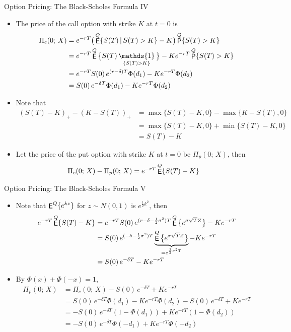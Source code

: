 \documentclass[10pt,handout]{beamer}
\DeclareMathOperator\indc{\mathds{1}}
\DeclareMathOperator\prb{{\sf P}}
\DeclareMathOperator\expc{{\sf E}}
\theoremstyle{definition}
\begin{document}
\begin{frame}{Option Pricing: The Black-Scholes Formula IV}
  \begin{itemize}
    \item The price of the call option with strike $K$ at $t = 0$ is
      \begin{align*}
        \Pi_c(0;\,X) &= e^{-rT}\big(\expc^Q\{S(T)\,|\, S(T) > K\} - K\big)\prb^Q\{S(T) > K\} \\
        &= e^{-rT}\expc^Q\big\{S(T)\indc_{\{S(T) > K\}}\big\} - Ke^{-rT}\prb^Q\{S(T) > K\} \\
        &= e^{-rT}S(0)\,e^{(r - \delta)T}\Phi(d_1) - Ke^{-rT}\Phi(d_2) \\
        &= S(0)\,e^{-\delta T}\Phi(d_1) - Ke^{-rT}\Phi(d_2)
      \end{align*}
    \item Note that 
      \begin{align*}
        (S(T) - K)_+ - (K - S(T))_+ &= \max\{S(T) - K, 0\} - \max\{K - S(T), 0\} \\
        &= \max\{S(T) - K, 0\} + \min\{S(T) - K, 0\} \\ &= S(T) - K
      \end{align*}
    \item Let the price of the put option with strike $K$ at $t = 0$ be $\Pi_p(0;\,X)$, then
      \begin{align*}
        \Pi_c(0;\,X) - \Pi_p(0;\,X) &= e^{-rT}\expc^Q\{S(T) - K\}
      \end{align*}
  \end{itemize}
\end{frame}

\begin{frame}{Option Pricing: The Black-Scholes Formula V}
  \begin{itemize}
    \item Note that $\expc^Q\{e^{kz}\}$ for $z\sim N(0, 1)$ is $e^{\frac{1}{2}k^2}$, then
      \begin{align*}
        e^{-rT}\expc^Q\{S(T) - K\} &= e^{-rT}S(0)\,e^{(r - \delta - \frac{1}{2}\sigma^2)T}\expc^Q\big\{e^{\sigma\sqrt{T}Z}\big\} - K e^{-rT} \\
        &= S(0)\,e^{(- \delta - \frac{1}{2}\sigma^2)T}\underbrace{\expc^Q\big\{e^{\sigma\sqrt{T}Z}\big\}}_{ = e^{\frac{1}{2}\sigma^2T}}- K e^{-rT} \\
        &= S(0)\,e^{-\delta T} - K e^{-rT}
      \end{align*}
    \item By $\Phi(x) + \Phi(-x) = 1$,
      \begin{align*}
        \Pi_p(0;\,X) &= \Pi_c(0;\,X) - S(0)\,e^{-\delta T} + K e^{-rT} \\
                     &= S(0)\,e^{-\delta T}\Phi(d_1) - Ke^{-rT}\Phi(d_2) - S(0)\,e^{-\delta T} + K e^{-rT} \\ 
                     &= -S(0)\,e^{-\delta T}(1 - \Phi(d_1)) + Ke^{-rT}(1 - \Phi(d_2))\\ 
                     &= -S(0)\,e^{-\delta T}\Phi(-d_1) + Ke^{-rT}\Phi(-d_2) 
      \end{align*}
  \end{itemize}
\end{frame}
\end{document}
